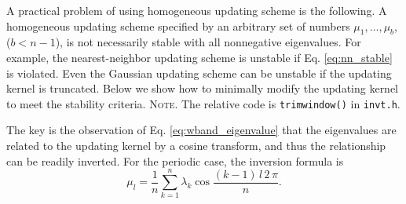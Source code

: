 \documentclass[reprint, floatfix]{revtex4-1}
\newcommand{\note}[1]{{\color{DarkGreen}\footnotesize \textsc{Note.} #1}}
\begin{document}
A practical problem of using homogeneous updating scheme
is the following.
%
A homogeneous updating scheme
specified by an arbitrary set of numbers
$\mu_1, \dots, \mu_b$, ($b < n - 1$),
is not necessarily stable
with all nonnegative eigenvalues.
%
%
For example, the nearest-neighbor updating scheme
is unstable if Eq. \eqref{eq:nn_stable} is violated.
%
Even the Gaussian updating scheme can be unstable
if the updating kernel is truncated.
%
Below we show how to minimally modify
the updating kernel
to meet the stability criteria.
%
\note{The relative code is \texttt{trimwindow()} in \texttt{invt.h}.
}


The key is the observation of Eq. \eqref{eq:wband_eigenvalue}
that the eigenvalues are related to the updating kernel
by a cosine transform,
and thus the relationship can be readily inverted.
%
For the periodic case,
the inversion formula is
%
\begin{equation}
  \mu_l
  =
  \frac 1 n
  \sum_{ k = 1 }^n
  \lambda_k
  \cos \frac{ (k - 1) \, l \, 2 \, \pi }
            {            n             }
  .
\label{eq:mu_from_lambda_pbc}
\end{equation}
\end{document}
